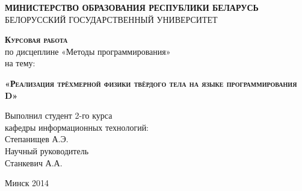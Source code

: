 \begin{titlepage}
\newpage

\begin{center}
\textsc{\textbf{МИНИСТЕРСТВО ОБРАЗОВАНИЯ РЕСПУБЛИКИ БЕЛАРУСЬ}} \\
\vspace{1cm}
БЕЛОРУССКИЙ ГОСУДАРСТВЕННЫЙ УНИВЕРСИТЕТ \\
\end{center}
 
\vspace{8em}

\begin{center}
\Large \textsc{\textbf{Курсовая работа}} \\
по дисцеплине  «Методы программирования» \\
на тему:
\end{center}

\vspace{2.5em}
 
\begin{center}
\textsc{\textbf{«Реализация трёхмерной физики твёрдого тела \linebreak на языке программирования D»}}
\end{center}

\vspace{12em}
 
\begin{flushleft}
Выполнил студент 2-го курса \\
кафедры информационных технологий: \\
Степанищев А.Э. \\
\vspace{1.5em}
Научный руководитель \\
Станкевич А.А.\\
\vspace{1.5em}
\end{flushleft}
 
\vspace{\fill}

\begin{center}
Минск 2014
\end{center}

\end{titlepage}